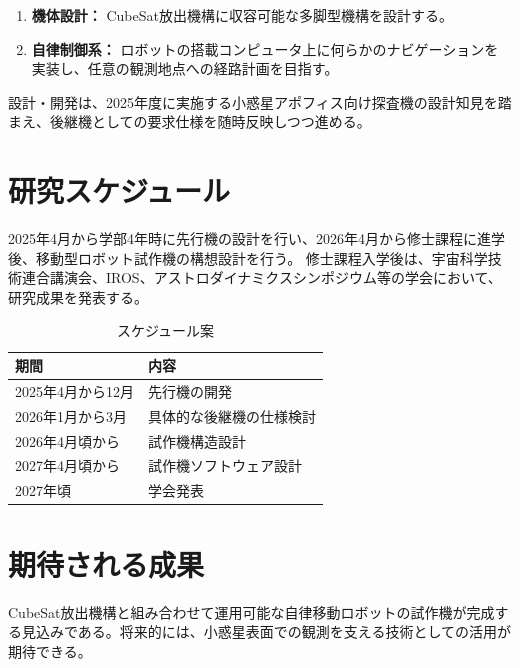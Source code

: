\documentclass[dvipdfmx,titlepage,a4j]{jsarticle}
\begin{document}
\begin{enumerate}
    \item \textbf{機体設計：}
          CubeSat放出機構に収容可能な多脚型機構を設計する。
    \item \textbf{自律制御系：}
          ロボットの搭載コンピュータ上に何らかのナビゲーションを実装し、任意の観測地点への経路計画を目指す。
\end{enumerate}

設計・開発は、2025年度に実施する小惑星アポフィス向け探査機の設計知見を踏まえ、後継機としての要求仕様を随時反映しつつ進める。


\section{研究スケジュール}
2025年4月から学部4年時に先行機の設計を行い、2026年4月から修士課程に進学後、移動型ロボット試作機の構想設計を行う。
修士課程入学後は、宇宙科学技術連合講演会、IROS、アストロダイナミクスシンポジウム等の学会において、研究成果を発表する。

\begin{table}[H]
    \centering
    \caption{スケジュール案}
    \begin{tabular}{l|l}
        \hline
        期間           & 内容           \\
        \hline \hline
        2025年4月から12月 & 先行機の開発       \\
        \hline
        2026年1月から3月  & 具体的な後継機の仕様検討 \\
        \hline
        2026年4月頃から   & 試作機構造設計      \\
        \hline
        2027年4月頃から   & 試作機ソフトウェア設計  \\
        \hline
        2027年頃       & 学会発表         \\
        \hline
    \end{tabular}
    \label{tab:schedule}
\end{table}

\section{期待される成果}
CubeSat放出機構と組み合わせて運用可能な自律移動ロボットの試作機が完成する見込みである。将来的には、小惑星表面での観測を支える技術としての活用が期待できる。

\newpage

\nocite{*}


\end{document}
